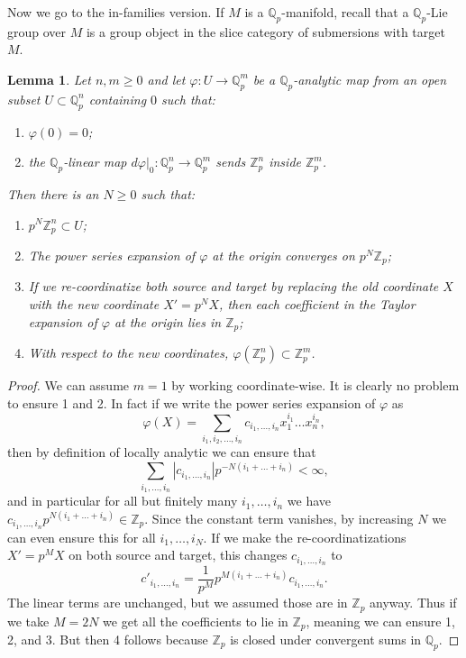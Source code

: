 \documentclass[12pt]{article}
\newtheorem{lemma}[theorem]{Lemma}
\newcommand{\mbb}{\mathbb}
\begin{document}
Now we go to the in-families version.  If $M$ is a $\mathbb{Q}_p$-manifold, recall that a $\mathbb{Q}_p$-Lie group over $M$ is a group object in the slice category of submersions with target $M$.

\begin{lemma}\label{nonarchimedeancontract}
Let $n,m\geq 0$ and let $\varphi: U\to\mathbb{Q}_p^m$ be a $\mathbb{Q}_p$-analytic map from an open subset $U\subset \mathbb{Q}_p^n$ containing $0$ such that:
\begin{enumerate}
\item $\varphi(0)=0$;
\item the $\mathbb{Q}_p$-linear map $d\varphi |_0:\mathbb{Q}_p^n \to \mathbb{Q}_p^m$ sends $\mathbb{Z}_p^n$ inside $\mathbb{Z}_p^m$.
\end{enumerate}
Then there is an $N\geq 0$ such that:
\begin{enumerate}
\item $p^N\mathbb{Z}_p^n\subset U$;
\item The power series expansion of $\varphi$ at the origin converges on $p^N\mathbb{Z}_p$;
\item If we re-coordinatize both source and target by replacing the old coordinate $X$ with the new coordinate $X'=p^NX$, then each coefficient in the Taylor expansion of $\varphi$ at the origin lies in $\mathbb{Z}_p$;
\item With respect to the new coordinates, $\varphi(\mathbb{Z}_p^n)\subset \mathbb{Z}_p^m$.
\end{enumerate}
\end{lemma}
\begin{proof}
We can assume $m=1$ by working coordinate-wise.  It is clearly no problem to ensure 1 and 2.  In fact if we write the power series expansion of $\varphi$ as
$$\varphi(X) = \sum_{i_1,i_2,\ldots,i_n} c_{i_1,\ldots,i_n}x_1^{i_1}\ldots x_n^{i_n},$$
then by definition of locally analytic we can ensure that
$$\sum_{i_1,\ldots,i_n} |c_{i_1,\ldots,i_n}|p^{-N(i_1+\ldots+i_n)}<\infty,$$
and in particular for all but finitely many $i_1,\ldots,i_n$ we have $c_{i_1,\ldots,i_n}p^{N(i_1+\ldots+i_n)}\in \mbb{Z}_p$.  Since the constant term vanishes, by increasing $N$ we can even ensure this for all $i_1,\ldots,i_N$.  If we make the re-coordinatizations $X'= p^MX$ on both source and target, this changes $c_{i_1,\ldots,i_n}$ to
$$c'_{i_1,\ldots,i_n} = \frac{1}{p^M}p^{M(i_1+\ldots+i_n)}c_{i_1,\ldots,i_n}.$$
The linear terms are unchanged, but we assumed those are in $\mathbb{Z}_p$ anyway.  Thus if we take $M=2N$ we get all the coefficients to lie in $\mathbb{Z}_p$, meaning we can ensure 1, 2, and 3.  But then 4 follows because $\mathbb{Z}_p$ is closed under convergent sums in $\mathbb{Q}_p$.

\end{proof}
\end{document}
